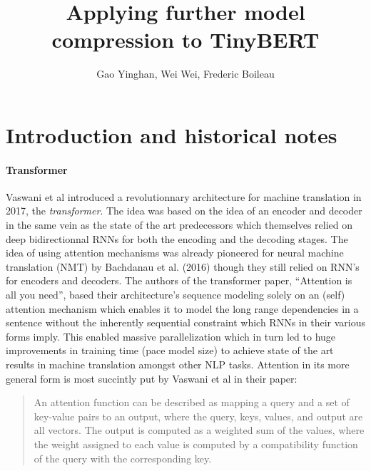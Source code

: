 \documentclass{article}
\title{\textbf{Applying further model compression to TinyBERT}}
\author{Gao Yinghan, Wei Wei, Frederic Boileau}
\begin{document}
\thispagestyle{plain}
\maketitle
\medskip

\section{Introduction and historical notes}

\paragraph{Transformer} Vaswani et al \cite{allyouneed} introduced a
revolutionnary architecture for machine translation in 2017, the
\textit{transformer}.  The idea was based on the idea of an encoder and decoder
in the same vein as the state of the art predecessors which themselves relied on
deep bidirectionnal RNNs for both the encoding and the decoding stages. The idea
of using attention mechanisms was already pioneered for neural machine
translation (NMT) by Bachdanau et al. (2016)\cite{bahdanau2016neural} though
they still relied on RNN's for encoders and decoders. The authors of the
transformer paper, ``Attention is all you need'', based their architecture's
sequence modeling solely on an (self) attention mechanism which enables it to
model the long range dependencies in a sentence without the inherently
sequential constraint which RNNs in their various forms imply. This enabled
massive parallelization which in turn led to huge improvements in training time
(pace model size) to achieve state of the art results in machine translation
amongst other NLP tasks.  Attention in its more general form is most succintly
put by Vaswani et al in their paper: \blockcquote{allyouneed}{An attention
function can be described as mapping a query and a set of key-value pairs to an
output, where the query, keys, values, and output are all vectors.  The output
is computed as a weighted sum of the values, where the weight assigned to each
value is computed by a compatibility function of the
query with the corresponding key.}
\end{document}
